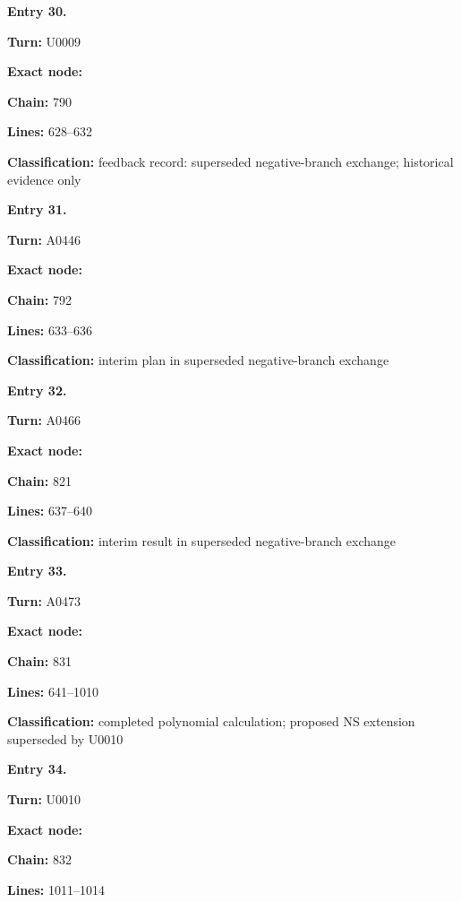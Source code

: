 \documentclass[10pt,a4paper,oneside]{report}
\begin{document}
\textbf{Entry 30.}

\textbf{Turn:} U0009

\textbf{Exact node:} \protect{}

\textbf{Chain:} 790

\textbf{Lines:} 628--632

\textbf{Classification:} feedback record: superseded negative-branch
exchange; historical evidence only


\textbf{Entry 31.}

\textbf{Turn:} A0446

\textbf{Exact node:} \protect{}

\textbf{Chain:} 792

\textbf{Lines:} 633--636

\textbf{Classification:} interim plan in superseded negative-branch
exchange


\textbf{Entry 32.}

\textbf{Turn:} A0466

\textbf{Exact node:} \protect{}

\textbf{Chain:} 821

\textbf{Lines:} 637--640

\textbf{Classification:} interim result in superseded negative-branch
exchange


\textbf{Entry 33.}

\textbf{Turn:} A0473

\textbf{Exact node:} \protect{}

\textbf{Chain:} 831

\textbf{Lines:} 641--1010

\textbf{Classification:} completed polynomial calculation; proposed NS
extension superseded by U0010


\textbf{Entry 34.}

\textbf{Turn:} U0010

\textbf{Exact node:} \protect{}

\textbf{Chain:} 832

\textbf{Lines:} 1011--1014
\end{document}
